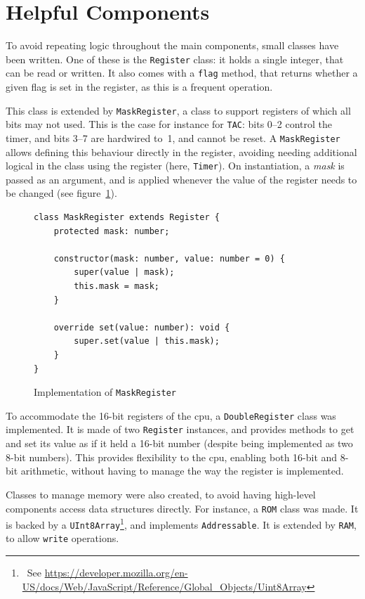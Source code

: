 \documentclass[11pt]{informatics-report}
\newcommand{\ftnt}[1]{\footnote{~See \url{#1}}}
\begin{document}
\section{Helpful Components}

To avoid repeating logic throughout the main components, small classes have been written. One of these is the \texttt{Register} class: it holds a single integer, that can be read or written. It also comes with a \texttt{flag} method, that returns whether a given flag is set in the register, as this is a frequent operation.

This class is extended by \texttt{MaskRegister}, a class to support registers of which all bits may not used. This is the case for instance for \texttt{TAC}: bits 0--2 control the timer, and bits 3--7 are hardwired to~1, and cannot be reset. A \texttt{MaskRegister} allows defining this behaviour directly in the register, avoiding needing additional logical in the class using the register (here, \texttt{Timer}). On instantiation, a \textit{mask} is passed as an argument, and is applied whenever the value of the register needs to be changed (see figure~\ref{fig:mask-register}).

\begin{figure}[h]
    \begin{verbatim}
class MaskRegister extends Register {
    protected mask: number;

    constructor(mask: number, value: number = 0) {
        super(value | mask);
        this.mask = mask;
    }

    override set(value: number): void {
        super.set(value | this.mask);
    }
}
    \end{verbatim}
    \caption{Implementation of \texttt{MaskRegister}}
    \label{fig:mask-register}
\end{figure}

To accommodate the 16-bit registers of the \gls{cpu}, a \texttt{DoubleRegister} class was implemented. It is made of two \texttt{Register} instances, and provides methods to get and set its value as if it held a 16-bit number (despite being implemented as two 8-bit numbers). This provides flexibility to the \gls{cpu}, enabling both 16-bit and 8-bit arithmetic, without having to manage the way the register is implemented.

Classes to manage memory were also created, to avoid having high-level components access data structures directly. For instance, a \texttt{ROM} class was made. It is backed by a \texttt{UInt8Array}\ftnt{https://developer.mozilla.org/en-US/docs/Web/JavaScript/Reference/Global_Objects/Uint8Array}, and implements \texttt{Addressable}. It is extended by \texttt{RAM}, to allow \texttt{write} operations.
\end{document}
